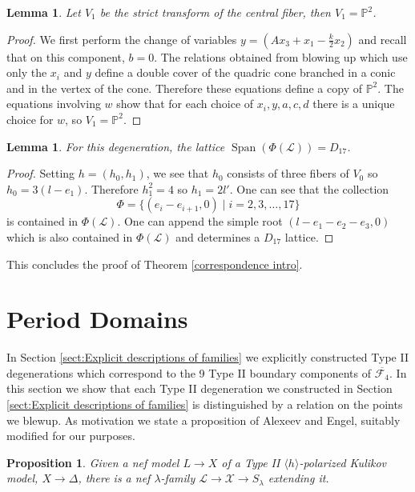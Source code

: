 \documentclass[a4paper]{amsart}
\theoremstyle{definition}
\theoremstyle{plain}
\newtheorem{lemma}[defn]{Lemma}
\newtheorem{prop}[defn]{Proposition}
\theoremstyle{remark}
\newcommand{\PS}{\mathbb{P}}
\begin{document}
\begin{lemma}
Let $V_1$ be the strict transform of the central fiber, then $V_1 = \PS^2$.
\end{lemma}

\begin{proof}
We first perform the change of variables $y=\left(Ax_3+x_1-\frac{k}{2}x_2\right)$ and recall that on this component, $b=0$. The relations obtained from blowing up which use only the $x_i$ and $y$ define a double cover of the quadric cone branched in a conic and in the vertex of the cone. Therefore these equations define a copy of $\PS^2$. The equations involving $w$ show that for each choice of $x_i, y, a, c, d$ there is a unique choice for $w$, so $V_1 = \PS^2$.
\end{proof}

\begin{lemma}
For this degeneration, the lattice $\operatorname{Span}(\Phi(\mathscr{L}))=D_{17}$.
\end{lemma}

\begin{proof}
Setting $h=(h_0,h_1)$, we see that $h_0$ consists of three fibers of $V_0$ so $h_0 = 3(l-e_1)$. Therefore $h_1^2=4$ so $h_1=2l'$. One can see that the collection 
$$\Phi = \{(e_i-e_{i+1},0) \mid i=2,3,\dots,17\}$$
is contained in $\Phi(\mathscr{L})$. One can append the simple root $(l-e_1-e_2-e_3,0)$ which is also contained in $\Phi(\mathscr{L})$ and determines a $D_{17}$ lattice.
\end{proof}

This concludes the proof of Theorem \ref{correspondence intro}. 

\section{Period Domains}\label{sect:period domains}
In Section \ref{sect:Explicit descriptions of families} we explicitly constructed Type II degenerations which correspond to the 9 Type II boundary components of $\overline{\mathcal{F}_4}$. In this section we show that each Type II degeneration we constructed in Section \ref{sect:Explicit descriptions of families} is distinguished by a relation on the points we blewup. As motivation we state a proposition of Alexeev and Engel, suitably modified for our purposes.

\begin{prop}\cite[Proposition 7.33]{AE23}\label{prop: nef model extension}
Given a nef model $L\rightarrow X$ of a Type II $\langle h \rangle$-polarized Kulikov model, $X\rightarrow \Delta$, there is a nef $\lambda$-family $\mathcal{L}\rightarrow \mathcal{X}\rightarrow S_\lambda$ extending it.
\end{prop}
\end{document}
